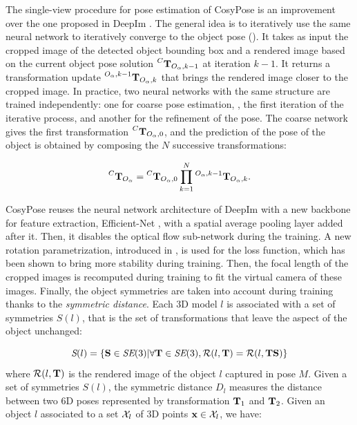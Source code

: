 The single-view procedure for pose estimation of CosyPose is an improvement over the one proposed in DeepIm \cite{deepim_2019}. The general idea is to iteratively 
use the same neural network to iteratively converge to the object pose (). It takes as input the cropped image of the detected 
object bounding box and a rendered image based on the current object pose solution $\prescript{C}{}{{\bf T}}_{O_{\alpha},k-1}$ at iteration $k-1$. 
It returns a transformation update $\prescript{O_{\alpha},k-1}{}{{\bf T}}_{O_{\alpha},k}$ that brings the rendered image closer to the cropped image. In practice, 
two neural networks with the same structure are trained independently: one for coarse pose estimation, \ie, the first iteration of the iterative process, 
and another for the refinement of the pose. The coarse network gives the first transformation $\prescript{C}{}{{\bf T}}_{O_{\alpha},0}$, 
and the prediction of the pose of the object is obtained by composing the $N$ successive transformations:

\begin{equation}
\prescript{C}{}{{\bf T}}_{O_{\alpha}} = \prescript{C}{}{{\bf T}}_{O_{\alpha},0} \prod_{k=1}^N  \prescript{O_{\alpha},k-1}{}{{\bf T}}_{O_{\alpha},k}.
\end{equation}

CosyPose reuses the neural network architecture of DeepIm with a new backbone for feature extraction, Efficient-Net \cite{tan2020efficientnet} ,
with a spatial average pooling layer added after it. Then, it disables the optical flow sub-network during the training. 
A new rotation parametrization, introduced in \cite{zhou2020continuity}, is used for the loss function, which has been shown 
to bring more stability during training. Then, the focal length of the cropped images is recomputed during training to fit the virtual camera 
of these images. Finally, the object symmetries are taken into account during training thanks to the \textit{symmetric distance}. 
Each 3D model $l$ is associated with a set of symmetries $S(l)$, that is the set of transformations that leave the aspect of the object unchanged:

\begin{equation}
    \textit{S}(l) = \left \{ {\bf S} \in \textit{SE}(3) | \forall {\bf T} \in \textit{SE}(3), \mathcal{R}(l,{\bf T}) = \mathcal{R}(l,{\bf T} {\bf S})\right \}
\end{equation}
%
where $\mathcal{R}(l,{\bf T})$ is the rendered image of the object $l$ captured in pose $M$. Given a set of symmetries $S(l)$, 
the symmetric distance $D_l$ measures the distance between two 6D poses represented by transformation ${\bf T}_1$ and ${\bf T}_2$. 
Given an object $l$ associated to a set $\mathcal{X}_l$ of 3D points $\mathbf{x} \in \mathcal{X}_l$, we have:

